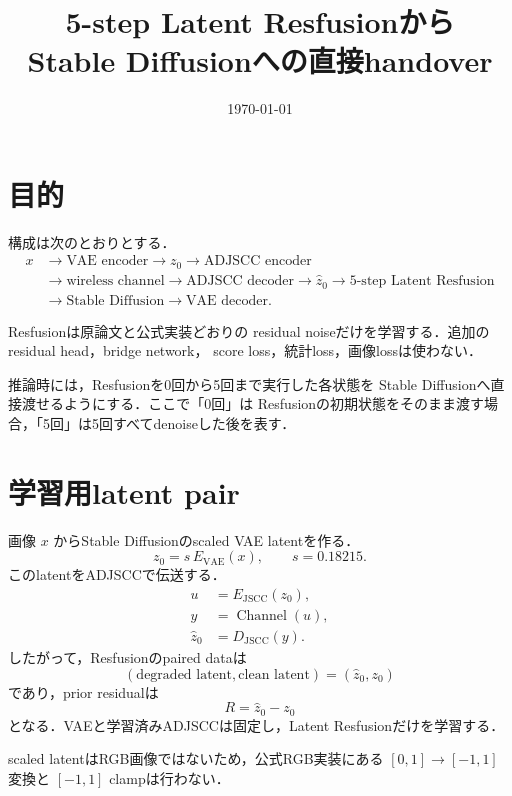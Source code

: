 \documentclass[11pt,a4paper]{ltjsarticle}
\title{5-step Latent Resfusionから\\
Stable Diffusionへの直接handover}
\author{}
\date{\today}
\begin{document}
\maketitle

\section{目的}

構成は次のとおりとする．
\[
\begin{aligned}
x
&\longrightarrow \text{VAE encoder}
\longrightarrow z_0
\longrightarrow \text{ADJSCC encoder} \\
&\longrightarrow \text{wireless channel}
\longrightarrow \text{ADJSCC decoder}
\longrightarrow \hat z_0
\longrightarrow \text{5-step Latent Resfusion} \\
&\longrightarrow \text{Stable Diffusion}
\longrightarrow \text{VAE decoder}.
\end{aligned}
\]

Resfusionは原論文\cite{resfusion}と公式実装\cite{resfusion-code}どおりの
residual noiseだけを学習する．追加のresidual head，bridge network，
score loss，統計loss，画像lossは使わない．

推論時には，Resfusionを0回から5回まで実行した各状態を
Stable Diffusionへ直接渡せるようにする．ここで「0回」は
Resfusionの初期状態をそのまま渡す場合，「5回」は5回すべてdenoiseした後を表す．

\section{学習用latent pair}

画像 \(x\) からStable Diffusionのscaled VAE latentを作る．
\[
  z_0=s\,E_{\mathrm{VAE}}(x),
  \qquad s=0.18215.
\]
このlatentをADJSCCで伝送する．
\[
\begin{aligned}
  u &= E_{\mathrm{JSCC}}(z_0),\\
  y &= \operatorname{Channel}(u),\\
  \hat z_0 &= D_{\mathrm{JSCC}}(y).
\end{aligned}
\]
したがって，Resfusionのpaired dataは
\[
  (\text{degraded latent},\text{clean latent})
  =
  (\hat z_0,z_0)
\]
であり，prior residualは
\begin{equation}
  R=\hat z_0-z_0
  \label{eq:residual}
\end{equation}
となる．VAEと学習済みADJSCCは固定し，Latent Resfusionだけを学習する．

scaled latentはRGB画像ではないため，公式RGB実装にある
\([0,1]\to[-1,1]\) 変換と \([-1,1]\) clampは行わない．
\end{document}
